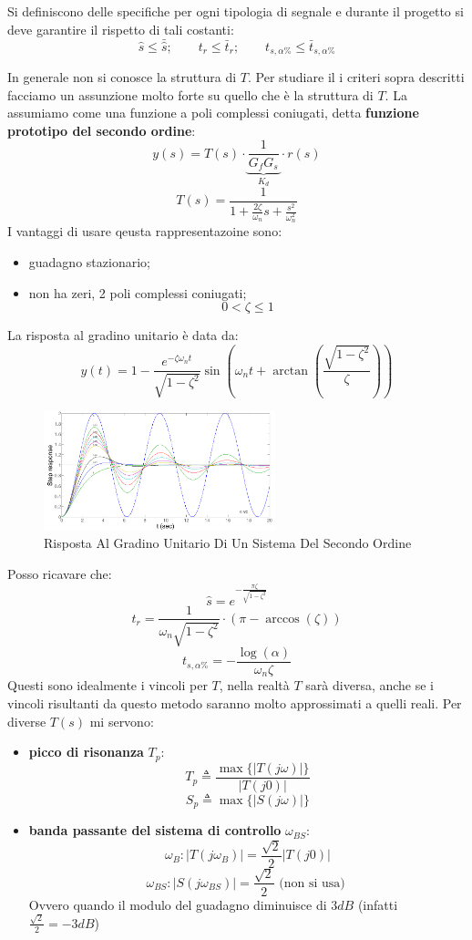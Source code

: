 \documentclass[12pt]{article}
\begin{document}
Si definiscono delle specifiche per ogni tipologia di segnale e durante il progetto si deve garantire il rispetto di tali costanti:
\[ \boxed{ \hat{s} \leqslant \bar{\hat{s}};\qquad t_r \leqslant \bar{t}_r;\qquad t_{s,\alpha\%} \leqslant \bar{t}_{s,\alpha\%} } \]

In generale non si conosce la struttura di $T$. Per studiare il i criteri sopra descritti facciamo un assunzione molto forte su quello che \`e la struttura di $T$. La assumiamo come una funzione a poli complessi coniugati, detta \textbf{funzione prototipo del secondo ordine}:
\[ y(s) = T(s) \cdot \underbrace{\frac{1}{G_fG_s}}_{K_d} \cdot r(s) \]
\[ T(s) = \frac{1}{\displaystyle 1 + \frac{2\zeta}{\omega_n} s + \frac{s^{2}}{\omega_n^{2}} }  \]
I vantaggi di usare qeusta rappresentazoine sono:
\begin{itemize}
    \item guadagno stazionario;
    \item non ha zeri, 2 poli complessi coniugati;
        \[ 0 < \zeta \leqslant 1 \]
\end{itemize}
La risposta al gradino unitario \`e data da:
\[ y(t) = 1 - \frac{e^{-\zeta\omega_n t}}{\sqrt{1-\zeta^{2}}} \sin\left( \omega_n t + \arctan \left( \frac{\sqrt{1-\zeta^{2}}}{\zeta}  \right)  \right)   \]
\begin{figure}[H]
    \centering
    \includegraphics[width=0.6\textwidth]{risposta-al-gradino-unitario-di-un-sistema-del-secondo-ordine.png}
    \caption{Risposta Al Gradino Unitario Di Un Sistema Del Secondo Ordine}
    \label{fig:risposta-al-gradino-unitario-di-un-sistema-del-secondo-ordine}
\end{figure}
Posso ricavare che:
\[ \boxed{\hat{s} = e^{ -\frac{ \pi\zeta }{ \sqrt{1 - \zeta^{2}} } } } \]
\[ \boxed{ t_r = \frac{1}{\omega_n\sqrt{1-\zeta^{2}}} \cdot (\pi - \arccos(\zeta)) } \]
\[ \boxed{ t_{s,\alpha\%} = - \frac{\log(\alpha)}{\omega_n\zeta}  } \]
Questi sono idealmente i vincoli per $T$, nella realt\`a $T$ sar\`a diversa, anche se i vincoli risultanti da questo metodo saranno molto approssimati a quelli reali. Per diverse $T(s)$ mi servono:
\begin{itemize}
    \item \textbf{picco di risonanza} $T_p$:
        \[ T_p \triangleq \frac{\max\{|T(j\omega)|\}}{|T(j0)|}  \]
        \[ S_p \triangleq \max\{|S(j\omega)|\} \]
    \item \textbf{banda passante del sistema di controllo} $\omega _{BS}$:
        \[ \omega_{B}: |T(j\omega_{B})| = \frac{\sqrt{2}}{2} |T(j0)| \]
        \[ \omega _{BS}:  |S(j\omega_{BS})| = \frac{\sqrt{2}}{2} \text{ (non si usa) } \]
        Ovvero quando il modulo del guadagno diminuisce di $3dB$ (infatti $\frac{\sqrt{2}}{2} = -3dB$)
\end{itemize}
\end{document}
